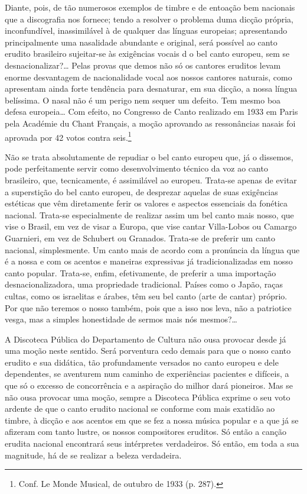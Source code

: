 Diante, pois, de tão numerosos exemplos de timbre e de entoação bem
nacionais que a discografia nos fornece; tendo a resolver o problema
duma dicção própria, inconfundível, inassimilável à de qualquer das
línguas europeias; apresentando principalmente uma nasalidade abundante
e original, será possível ao canto erudito brasileiro sujeitar-se às
exigências vocais d o bel canto europeu, sem se desnacionalizar?\ldots{}
Pelas provas que demos não só os cantores eruditos levam enorme
desvantagem de nacionalidade vocal aos nossos cantores naturais, como
apresentam ainda forte tendência para desnaturar, em sua dicção, a nossa
língua belíssima. O nasal não é um perigo nem sequer um defeito. Tem
mesmo boa defesa europeia\ldots{} Com efeito, no Congresso de Canto realizado
em 1933 em Paris pela Académie du Chant Français, a moção aprovando as
ressonâncias nasais foi aprovada por 42 votos contra seis.\footnote{Conf. Le Monde Musical, de outubro de 1933 (p. 287).}

Não se trata absolutamente de repudiar o bel canto europeu que, já o
dissemos, pode perfeitamente servir como desenvolvimento técnico da voz
ao canto brasileiro, que, tecnicamente, é assimilável ao europeu.
Trata-se apenas de evitar a superstição do bel canto europeu, de
desprezar aquelas de suas exigências estéticas que vêm diretamente ferir
os valores e aspectos essenciais da fonética nacional. Trata-se
especialmente de realizar assim um bel canto mais nosso, que vise o
Brasil, em vez de visar a Europa, que vise cantar Villa-Lobos ou Camargo
Guarnieri, em vez de Schubert ou Granados. Trata-se de preferir um canto
nacional, simplesmente. Um canto mais de acordo com a pronúncia da
língua que é a nossa e com os acentos e maneiras expressivas já
tradicionalizadas em nosso canto popular. Trata-se, enfim, efetivamente,
de preferir a uma importação desnacionalizadora, uma propriedade
tradicional. Países como o Japão, raças cultas, como os israelitas e
árabes, têm seu bel canto (arte de cantar) próprio. Por que não teremos
o nosso também, pois que a isso nos leva, não a patriotice vesga, mas a
simples honestidade de sermos mais nós mesmos?\ldots{}

A Discoteca Pública do Departamento de Cultura não ousa provocar desde
já uma moção neste sentido. Será porventura cedo demais para que o nosso
canto erudito e sua didática, tão profundamente versados no canto
europeu e dele dependentes, se aventurem num caminho de experiências
pacientes e difíceis, a que só o excesso de concorrência e a aspiração
do milhor dará pioneiros. Mas se não ousa provocar uma moção, sempre a
Discoteca Pública exprime o seu voto ardente de que o canto erudito
nacional se conforme com mais exatidão ao timbre, à dicção e aos acentos
em que se fez a nossa música popular e a que já se afizeram com tanto
lustre, os nossos compositores eruditos. Só então a canção erudita
nacional encontrará seus intérpretes verdadeiros. Só então, em toda a
sua magnitude, há de se realizar a beleza verdadeira.



